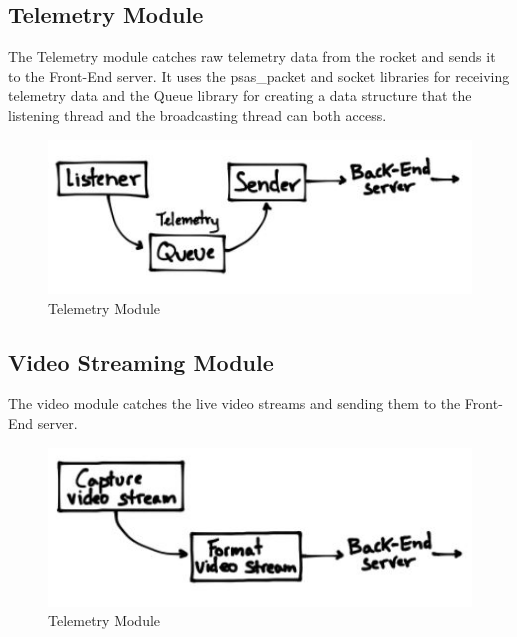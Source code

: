 \newpage

\subsection{Telemetry Module}
The Telemetry module catches raw telemetry data from the rocket and sends it to the Front-End server.
It uses the psas_packet and socket libraries for receiving telemetry data and the Queue library for 
creating a data structure that the listening thread and the broadcasting thread can both access.

\begin{figure}[!ht]
  \centering
  \includegraphics[scale=.8]{imgs/telemetry-detailed.jpg}
  \caption{Telemetry Module}
\end{figure}

\subsection{Video Streaming Module}
The video module catches the live video streams and sending them to the Front-End server.

\begin{figure}[!ht]
  \centering
  \includegraphics[scale=.8]{imgs/video-detailed.jpg}
  \caption{Telemetry Module}
\end{figure}
